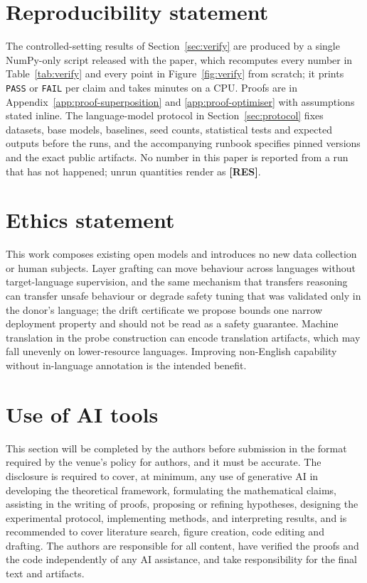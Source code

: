 \documentclass[10pt]{article}
\theoremstyle{plain}
\theoremstyle{definition}
\theoremstyle{remark}
\DeclareRobustCommand{\RES}[1][]{{\color{resred}\textbf{[RES#1]}}}
\begin{document}
\section*{Reproducibility statement}
The controlled-setting results of Section~\ref{sec:verify} are produced by a
single NumPy-only script released with the paper, which recomputes every number
in Table~\ref{tab:verify} and every point in Figure~\ref{fig:verify} from
scratch; it prints \texttt{PASS} or \texttt{FAIL} per claim and takes minutes on
a CPU. Proofs are in Appendix~\ref{app:proof-superposition} and
\ref{app:proof-optimiser} with assumptions stated inline. The language-model
protocol in Section~\ref{sec:protocol} fixes datasets, base models, baselines,
seed counts, statistical tests and expected outputs before the runs, and the
accompanying runbook specifies pinned versions and the exact public artifacts.
No number in this paper is reported from a run that has not happened; unrun
quantities render as \RES.

\section*{Ethics statement}
This work composes existing open models and introduces no new data collection or
human subjects. Layer grafting can move behaviour across languages without
target-language supervision, and the same mechanism that transfers reasoning can
transfer unsafe behaviour or degrade safety tuning that was validated only in
the donor's language; the drift certificate we propose bounds one narrow
deployment property and should not be read as a safety guarantee. Machine
translation in the probe construction can encode translation artifacts, which
may fall unevenly on lower-resource languages. Improving non-English capability
without in-language annotation is the intended benefit.

\section*{Use of AI tools}
This section will be completed by the authors before submission in the format
required by the venue's policy for authors, and it must be accurate. The
disclosure is required to cover, at minimum, any use of generative AI in
developing the theoretical framework, formulating the mathematical claims,
assisting in the writing of proofs, proposing or refining hypotheses, designing
the experimental protocol, implementing methods, and interpreting results, and
is recommended to cover literature search, figure creation, code editing and
drafting. The authors are responsible for all content, have verified the proofs
and the code independently of any AI assistance, and take responsibility for the
final text and artifacts.
\end{document}
